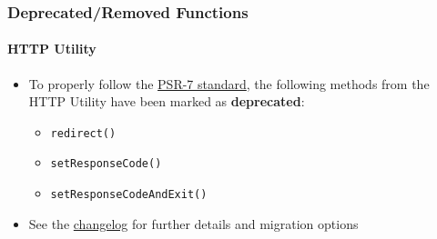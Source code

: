 %

\begin{frame}[fragile]
	\frametitle{Deprecated/Removed Functions}
	\framesubtitle{HTTP Utility}

	\begin{itemize}
		\item To properly follow the \href{https://www.php-fig.org/psr/psr-7/}{PSR-7 standard},
			the following methods from the HTTP Utility have been marked as \textbf{deprecated}:

			\begin{itemize}
				\item \texttt{redirect()}
				\item \texttt{setResponseCode()}
				\item \texttt{setResponseCodeAndExit()}
			\end{itemize}

		\item See the
			\href{https://docs.typo3.org/c/typo3/cms-core/master/en-us/Changelog/11.3/Deprecation-94316-DeprecatedHTTPHeaderManipulatingMethodsFromHttpUtility.html}{changelog}
			for further details and migration options

	\end{itemize}

\end{frame}

